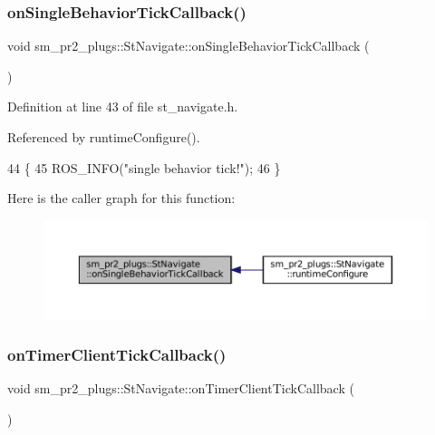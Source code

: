 \subsubsection{\texorpdfstring{on\+Single\+Behavior\+Tick\+Callback()}{onSingleBehaviorTickCallback()}}
{\footnotesize\ttfamily void sm\+\_\+pr2\+\_\+plugs\+::\+St\+Navigate\+::on\+Single\+Behavior\+Tick\+Callback (\begin{DoxyParamCaption}{ }\end{DoxyParamCaption})\hspace{0.3cm}{\ttfamily [inline]}}



Definition at line 43 of file st\+\_\+navigate.\+h.



Referenced by runtime\+Configure().


\begin{DoxyCode}
44     \{
45         ROS\_INFO(\textcolor{stringliteral}{"single behavior tick!"});
46     \}
\end{DoxyCode}
Here is the caller graph for this function\+:
\nopagebreak
\begin{figure}[H]
\begin{center}
\leavevmode
\includegraphics[width=350pt]{structsm__pr2__plugs_1_1StNavigate_a0e58e927f01a817040c13987ecd4695f_icgraph}
\end{center}
\end{figure}
\mbox{\label{structsm__pr2__plugs_1_1StNavigate_a6340d786397971eff5772816cdf7affc}} 
\subsubsection{\texorpdfstring{on\+Timer\+Client\+Tick\+Callback()}{onTimerClientTickCallback()}}
{\footnotesize\ttfamily void sm\+\_\+pr2\+\_\+plugs\+::\+St\+Navigate\+::on\+Timer\+Client\+Tick\+Callback (\begin{DoxyParamCaption}{ }\end{DoxyParamCaption})\hspace{0.3cm}{\ttfamily [inline]}}



